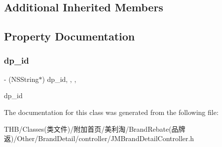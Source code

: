 \subsection*{Additional Inherited Members}


\subsection{Property Documentation}
\mbox{\label{interface_j_m_brand_detail_controller_a4886727a1b629d880c0de0dbc82a54af}} 
\subsubsection{\texorpdfstring{dp\+\_\+id}{dp\_id}}
{\footnotesize\ttfamily -\/ (N\+S\+String$\ast$) dp\+\_\+id\hspace{0.3cm}{\ttfamily [read]}, {\ttfamily [write]}, {\ttfamily [nonatomic]}, {\ttfamily [copy]}}

dp\+\_\+id 

The documentation for this class was generated from the following file\+:\begin{DoxyCompactItemize}
\item 
T\+H\+B/\+Classes(类文件)/附加首页/美利淘/\+Brand\+Rebate(品牌返)/\+Other/\+Brand\+Detail/controller/J\+M\+Brand\+Detail\+Controller.\+h\end{DoxyCompactItemize}
